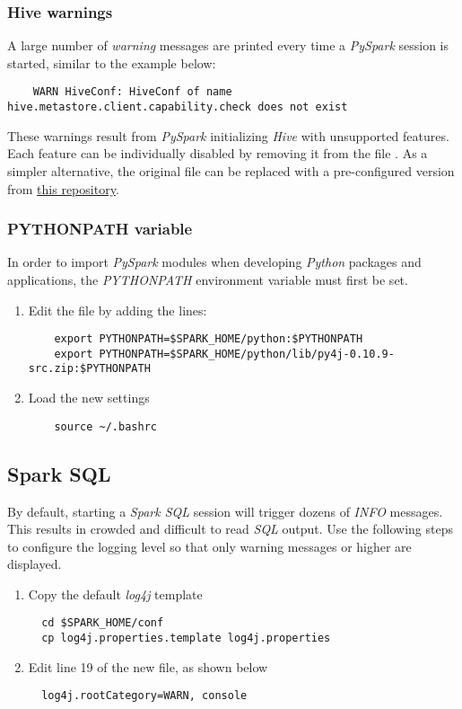 \documentclass{article}
\begin{document}
    \subsubsection{Hive warnings}
    A large number of \emph{warning} messages are printed every time a \emph{PySpark} session
    is started, similar to the example below:
    \begin{verbatim}
    WARN HiveConf: HiveConf of name hive.metastore.client.capability.check does not exist
    \end{verbatim}
    These warnings result from \emph{PySpark} initializing \emph{Hive} with unsupported
    features. Each feature can be individually disabled by removing it from the file
    . As a simpler alternative, the original
     file can be replaced with a pre-configured version from
    \href{https://github.com/tartagli0/spark-wsl/tree/master/conf}{this repository}.

    \subsubsection{PYTHONPATH variable}
    In order to import \emph{PySpark} modules when developing \emph{Python} packages and
    applications, the \emph{PYTHONPATH} environment variable must first be set.
    \begin{enumerate}
    \item Edit the  file by adding the lines:
    \begin{verbatim}
    export PYTHONPATH=$SPARK_HOME/python:$PYTHONPATH
    export PYTHONPATH=$SPARK_HOME/python/lib/py4j-0.10.9-src.zip:$PYTHONPATH
    \end{verbatim}

    \item Load the new settings
    \begin{verbatim}
    source ~/.bashrc
    \end{verbatim}
    \end{enumerate}

  \subsection{Spark SQL}
  By default, starting a \emph{Spark SQL} session will trigger dozens of \emph{INFO} messages.
  This results in crowded and difficult to read \emph{SQL} output. Use the following steps to
  configure the logging level so that only warning messages or higher are displayed.
  \begin{enumerate}
  \item Copy the default \emph{log4j} template
  \begin{verbatim}
  cd $SPARK_HOME/conf
  cp log4j.properties.template log4j.properties
  \end{verbatim}

  \item Edit line 19 of the new  file, as shown below
  \begin{verbatim}
  log4j.rootCategory=WARN, console
  \end{verbatim}
  \end{enumerate}
\end{document}
